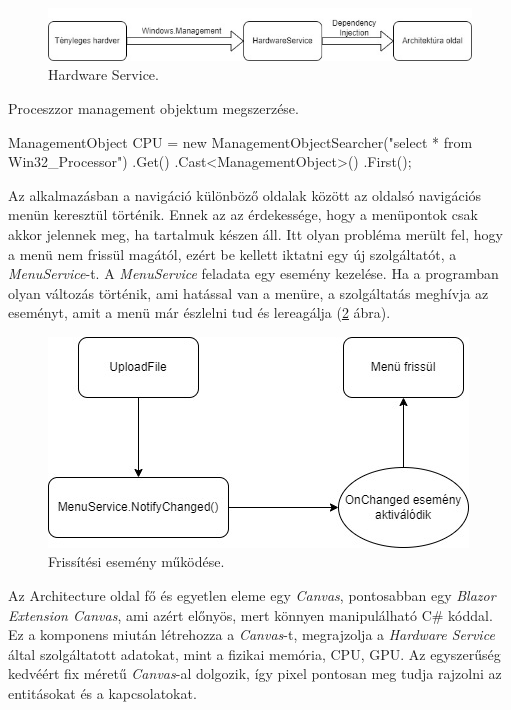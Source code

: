 \begin{figure}[h]
\centering
\includegraphics[scale=0.5]{images/HWS.jpg}
\caption{Hardware Service.}
\label{fig:hws}
\end{figure}

Proceszzor management objektum megszerzése.
\begin{cpp}
ManagementObject CPU = 
	new ManagementObjectSearcher("select * from Win32_Processor")
            .Get()
            .Cast<ManagementObject>()
            .First();
\end{cpp}

Az alkalmazásban a navigáció különböző oldalak között az oldalsó navigációs menün keresztül történik. Ennek az az érdekessége, hogy a menüpontok csak akkor jelennek meg, ha tartalmuk készen áll. Itt olyan probléma merült fel, hogy a menü nem frissül magától, ezért be kellett iktatni egy új szolgáltatót, a \textit{MenuService}-t. A \textit{MenuService} feladata egy esemény kezelése. Ha a programban olyan változás történik, ami hatással van a menüre, a szolgáltatás meghívja az eseményt, amit a menü már észlelni tud és lereagálja (\ref{fig:MenuEvent} ábra). 

\begin{figure}[h]
\centering
\includegraphics[scale=0.5]{images/MenuS.jpg}
\caption{Frissítési esemény működése.}
\label{fig:MenuEvent}
\end{figure}

Az Architecture oldal fő és egyetlen eleme egy \textit{Canvas}, pontosabban egy \textit{Blazor Extension Canvas}, ami azért előnyös, mert könnyen manipulálható C\# kóddal. Ez a komponens miután létrehozza a \textit{Canvas}-t, megrajzolja a \textit{Hardware Service} által szolgáltatott adatokat, mint a fizikai memória, CPU, GPU. Az egyszerűség kedvéért fix méretű \textit{Canvas}-al dolgozik, így pixel pontosan meg tudja rajzolni az entitásokat és a kapcsolatokat.

